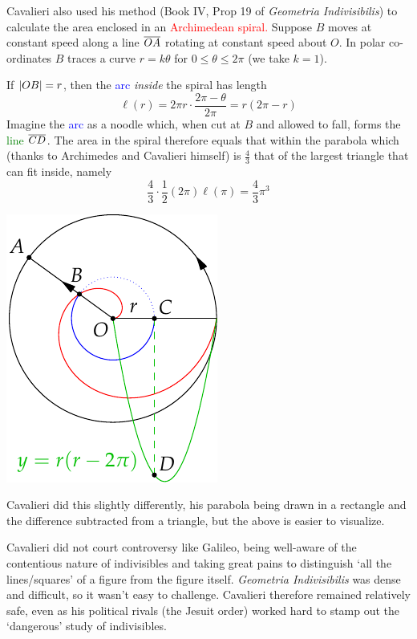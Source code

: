 \label{pg:cavspiral}
Cavalieri also used his method (Book IV, Prop 19 of \emph{Geometria Indivisibilis}) to calculate the area enclosed in an \textcolor{red}{Archimedean spiral.} Suppose $B$ moves at constant speed along a line $\overline{OA}$ rotating at constant speed about $O$. In polar co-ordinates $B$ traces a curve $r=k\theta$ for $0\le\theta\le 2\pi$ (we take $k=1$).\par
\begin{minipage}[t]{0.73\textwidth}\vspace{-5pt}
If $\left| OB\right|=r$, then the \textcolor{blue}{arc} \emph{inside} the spiral has length
\[\ell(r)=2\pi r\cdot\frac{2\pi-\theta}{2\pi}=r(2\pi-r)\]
Imagine the \textcolor{blue}{arc} as a noodle which, when cut at $B$ and allowed to fall, forms the \textcolor{Green}{line} $\overline{CD}$. The area in the spiral therefore equals that within the parabola which (thanks to Archimedes and Cavalieri himself) is  $\frac 43$ that of the largest triangle that can fit inside, namely
\[\frac 43\cdot \frac 12(2\pi)\ell(\pi)=\frac 43\pi^3\]
\end{minipage}\hfill\begin{minipage}[t]{0.25\textwidth}\vspace{-5pt}
\flushright\includegraphics[scale=0.9]{cavalieri1}
\end{minipage}\medbreak

Cavalieri did this slightly differently, his parabola being drawn in a rectangle and the difference subtracted from a triangle, but the above is easier to visualize.\medbreak %

Cavalieri did not court controversy like Galileo, being well-aware of the contentious nature of indivisibles and taking great pains to distinguish `all the lines/squares' of a figure from the figure itself. \emph{Geometria Indivisibilis} was dense and difficult, so it wasn't easy to challenge. Cavalieri therefore remained relatively safe, even as his political rivals (the Jesuit order) worked hard to stamp out the `dangerous' study of indivisibles.

